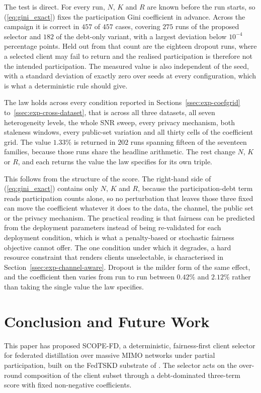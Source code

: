 \documentclass[journal]{IEEEtran}
\newcommand{\rev}[1]{#1}
\begin{document}
\rev{The test is direct. For every run, $N$, $K$ and $R$ are known before the run starts, so (\ref{eq:gini_exact}) fixes the participation Gini coefficient in advance. Across the campaign it is correct in $457$ of $457$ cases, covering $275$ runs of the proposed selector and $182$ of the debt-only variant, with a largest deviation below $10^{-4}$ percentage points. Held out from that count are the eighteen dropout runs, where a selected client may fail to return and the realised participation is therefore not the intended participation. The measured value is also independent of the seed, with a standard deviation of exactly zero over seeds at every configuration, which is what a deterministic rule should give.}

\rev{The law holds across every condition reported in Sections~\ref{ssec:exp-coefgrid} to~\ref{ssec:exp-cross-dataset}, that is across all three datasets, all seven heterogeneity levels, the whole SNR sweep, every privacy mechanism, both staleness windows, every public-set variation and all thirty cells of the coefficient grid. The value $1.33\%$ is returned in $202$ runs spanning fifteen of the seventeen families, because those runs share the headline arithmetic. The rest change $N$, $K$ or $R$, and each returns the value the law specifies for its own triple.}

\rev{This follows from the structure of the score. The right-hand side of (\ref{eq:gini_exact}) contains only $N$, $K$ and $R$, because the participation-debt term reads participation counts alone, so no perturbation that leaves those three fixed can move the coefficient whatever it does to the data, the channel, the public set or the privacy mechanism. The practical reading is that fairness can be predicted from the deployment parameters instead of being re-validated for each deployment condition, which is what a penalty-based or stochastic fairness objective cannot offer. The one condition under which it degrades, a hard resource constraint that renders clients unselectable, is characterised in Section~\ref{ssec:exp-channel-aware}. Dropout is the milder form of the same effect, and the coefficient then varies from run to run between $0.42\%$ and $2.12\%$ rather than taking the single value the law specifies.}

\section{Conclusion and Future Work}
\label{sec:conclusion}
This paper has proposed SCOPE-FD, a deterministic, fairness-first client selector for federated distillation over massive MIMO networks under partial participation, built on the FedTSKD substrate of \cite{mu2024fedtskd}. The selector acts on the over-round composition of the client subset through a debt-dominated three-term score with fixed non-negative coefficients.
\end{document}
